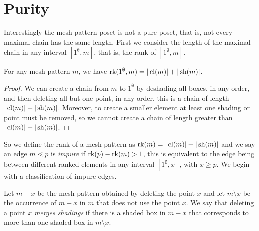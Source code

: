 \documentclass[11pt,a4paper,oneside]{article}
\begin{document}
\section{Purity}\label{sec:purity}

Interestingly the mesh pattern poset is not a pure poset, that is, not every
maximal chain has the same length. First we consider the length of the maximal chain in
any interval $[1^\emptyset,m]$, that is, the rank of $[1^\emptyset,m]$.
\begin{lem}
For any mesh pattern $m$, we have $\operatorname{\textrm{rk}}(1^\emptyset,m)=|\operatorname{\textrm{cl}}(m)|+|\operatorname{\textrm{sh}}(m)|$.
\begin{proof}
We can create a chain from $m$ to $1^\emptyset$ by deshading all boxes, in any order,
and then deleting all but one point, in any order, this is a chain of length $|\operatorname{\textrm{cl}}(m)|+|\operatorname{\textrm{sh}}(m)|$.
Moreover, to create a smaller element at least one shading or point must be removed, so we cannot create a chain of length greater than $|\operatorname{\textrm{cl}}(m)|+|\operatorname{\textrm{sh}}(m)|$.
\end{proof}
\end{lem}

So we define the rank of a mesh pattern as $\operatorname{\textrm{rk}}(m)=|\operatorname{\textrm{cl}}(m)|+|\operatorname{\textrm{sh}}(m)|$ and we say an 
edge $m\lessdot p$ is \emph{impure} if $\operatorname{\textrm{rk}}(p)-\operatorname{\textrm{rk}}(m)>1$, this is equivalent
to the edge being between different ranked elements in any interval $[1^\emptyset,x]$, with $x\ge p$.
We begin with a classification of impure edges.

 Let $m-x$ be the mesh pattern obtained by deleting the
point $x$ and let $m\setminus x$ be the occurrence of $m-x$ in $m$ that does not
use the point $x$. We say that deleting a point $x$ \emph{merges shadings} if
there is a shaded box in $m-x$ that corresponds to more than one shaded box in
$m\setminus x$.
\end{document}
